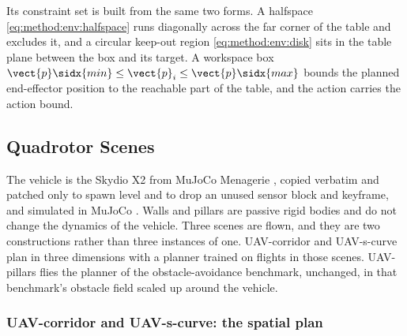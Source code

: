 Its constraint set is built from the same two forms. A halfspace
\eqref{eq:method:env:halfspace} runs diagonally across the far corner of the table and excludes it,
and a circular keep-out region \eqref{eq:method:env:disk} sits in the table plane between the box
and its target. A workspace box $\vect{p}\sidx{min}\le\vect{p}_{i}\le\vect{p}\sidx{max}$ bounds the
planned end-effector position to the reachable part of the table, and the action carries the action
bound.

\subsection{Quadrotor Scenes}\label{sec:method:env:uav}

The vehicle is the Skydio X2 from MuJoCo Menagerie \parencite{zakka2022menagerie}, copied verbatim and
patched only to spawn level and to drop an unused sensor block and keyframe, and simulated in MuJoCo
\parencite{todorov2012mujoco}. Walls and pillars are passive rigid bodies and do not change the dynamics
of the vehicle. Three scenes are flown, and they are two constructions rather than three instances of
one. UAV-corridor and UAV-s-curve plan in three dimensions with a planner trained on flights in those
scenes. UAV-pillars flies the planner of the obstacle-avoidance benchmark, unchanged, in that
benchmark's obstacle field scaled up around the vehicle.

\subsubsection*{UAV-corridor and UAV-s-curve: the spatial plan}

